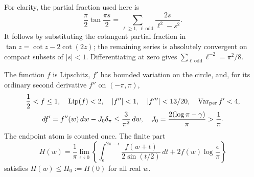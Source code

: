 For clarity, the partial fraction used here is
\[
 \frac\pi2\tan\frac{\pi s}{2}
 =\sum_{\ell\geq1,\ \ell\ \mathrm{odd}}\frac{2s}{\ell^2-s^2}.
\]
It follows by substituting the cotangent partial fraction in
$\tan z=\cot z-2\cot(2z)$; the remaining series is absolutely
convergent on compact subsets of $|s|<1$. Differentiating at zero
gives $\sum_{\ell\ \mathrm{odd}}\ell^{-2}=\pi^2/8$.
\begin{lemma}\label{uc:scalar-maximum}
The function $f$ is Lipschitz, $f'$ has bounded variation on the circle,
and, for its ordinary second derivative $f''$ on $(-\pi,\pi)$,
\begin{equation}\label{uc:scalar-bounds}
 \begin{gathered}
 \frac12<f\leq1,\quad \operatorname{Lip}(f)<2,\quad
 |f''|<1,\quad |f'''|<13/20,\quad
 \operatorname{Var}_{\rm per}f'<4,\\
 df'=f''(w)\,dw-J_0\delta_\pi\leq\frac3{\pi^2}\,dw,
 \quad J_0=\frac{2(\log\pi-\gamma)}\pi>\frac1\pi.
 \end{gathered}
\end{equation}
The endpoint atom is counted once. The finite part
\begin{equation}\label{uc:H}
 H(w)=\frac1\pi\lim_{\epsilon\downarrow0}
 \left\{\int_\epsilon^{2\pi-\epsilon}
 \frac{f(w+t)}{2\sin(t/2)}\,dt+2f(w)\log\frac\epsilon\pi\right\}
\end{equation}
satisfies $H(w)\leq H_0:=H(0)$ for all real $w$.
\end{lemma}
